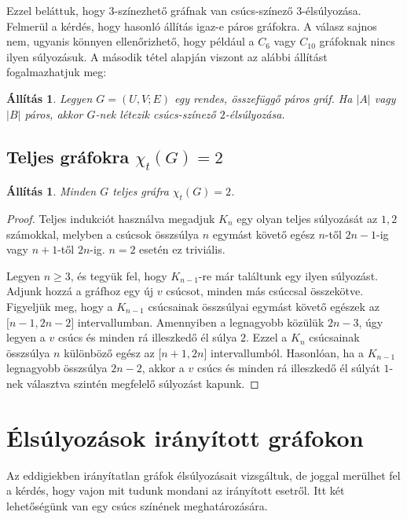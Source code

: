 \documentclass[12pt, a4paper]{report}
\newtheorem{áll}[tét]{Állítás}
\theoremstyle{remark}
\theoremstyle{definition}
\begin{document}
Ezzel beláttuk, hogy $3$-színezhető gráfnak van csúcs-színező $3$-élsúlyozása. Felmerül a kérdés, hogy hasonló állítás igaz-e páros gráfokra. A válasz sajnos nem, ugyanis könnyen ellenőrizhető, hogy például a $C_6$ vagy $C_{10}$ gráfoknak nincs ilyen súlyozásuk. A második tétel alapján viszont az alábbi állítást fogalmazhatjuk meg:

\begin{áll}
Legyen $G = (U, V; E)$ egy rendes, összefüggő páros gráf. Ha $|A|$ vagy $|B|$ páros, akkor $G$-nek létezik csúcs-színező $2$-élsúlyozása.
\end{áll}

\section{Teljes gráfokra $χ_t(G) = 2$}

\begin{áll}
Minden $G$ teljes gráfra $\chi_t(G) = 2$.
\end{áll}

\begin{proof}
Teljes indukciót használva megadjuk $K_n$ egy olyan teljes súlyozását az $1, 2$ számokkal, melyben a csúcsok összsúlya $n$ egymást követő egész $n$-től $2n - 1$-ig vagy $n + 1$-től $2n$-ig. $n = 2$ esetén ez triviális.

Legyen $n \geq 3$, és tegyük fel, hogy $K_{n - 1}$-re már találtunk egy ilyen súlyozást. Adjunk hozzá a gráfhoz egy új $v$ csúcsot, minden más csúccsal összekötve. Figyeljük meg, hogy a $K_{n - 1}$ csúcsainak összsúlyai egymást követő egészek az $\lbrack n - 1, 2n - 2 \rbrack$ intervallumban. Amennyiben a legnagyobb közülük $2n - 3$, úgy legyen a $v$ csúcs és minden rá illeszkedő él súlya $2$. Ezzel a $K_n$ csúcsainak összsúlya $n$ különböző egész az $\lbrack n + 1, 2n \rbrack$ intervallumból. Hasonlóan, ha a $K_{n - 1}$ legnagyobb összsúlya $2n - 2$, akkor a $v$ csúcs és minden rá illeszkedő él súlyát $1$-nek választva szintén megfelelő súlyozást kapunk.
\end{proof}

\chapter{Élsúlyozások irányított gráfokon}
Az eddigiekben irányítatlan gráfok élsúlyozásait vizsgáltuk, de joggal merülhet fel a kérdés, hogy vajon mit tudunk mondani az irányított esetről. Itt két lehetőségünk van egy csúcs színének meghatározására. 
\end{document}
